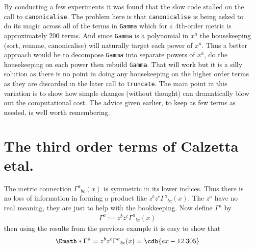 \documentclass[a4paper,12pt]{article}
\numberwithin{equation}{section}%
\begin{document}
By conducting a few experiments it was found that the slow code stalled on the call to
\verb|canonicalise|. The problem here is that \verb|canonicalise| is being asked to do its
magic across all of the terms in \verb|Gamma| which for a 4th-order metric is approximately
200 terms. And since \verb|Gamma| is a polynomial in $x^{a}$ the housekeeping (sort, rename,
canonicalise) will naturally target each power of $x^{a}$. Thus a better approach would be
to decompose \verb|Gamma| into separate powers of $x^{a}$, do the housekeeping on each power
then rebuild \verb|Gamma|. That will work but it is a silly solution as there is no point in
doing any housekeeping on the higher order terms as they are discarded in the later call to
\verb|truncate|. The main point in this variation is to show how simple changes (without
thought) can dramatically blow out the computational cost. The advice given earlier, to keep
as few terms as needed, is well worth remembering.

\clearpage

\section{The third order terms of Calzetta etal.}
\label{sec:ex-12}
\setcounter{ExerciseNum}{0}



The metric connection $\Gamma^{a}{}_{bc}(x)$ is symmetric in its lower indices. Thus there is
no loss of information in forming a product like $z^{b} z^{c} \Gamma^{a}{}_{bc}(x)$. The
$z^{a}$ have no real meaning, they are just to help with the bookkeeping. Now define
$\Gamma^{a}$ by \begin{align*}
   \Gamma^{a} := z^{b} z^{c} \Gamma^{a}{}_{bc}(x)
\end{align*}
then using the results from the previous example it is easy to show that
\begin{dgroup*}[spread=5pt]
   \Dmath*{ \Gamma^{a} = z^{b} z^{c} \Gamma^{a}{}_{bc}(x) = \cdb{ex-12.305} }
\end{dgroup*}
\end{document}
